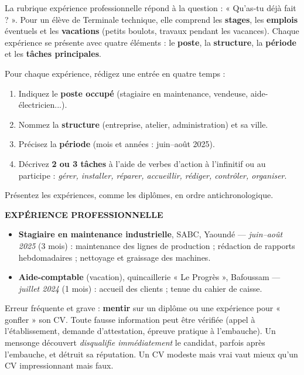 \documentclass[11pt]{article}
\newcommand{\cle}[1]{{\popxbold\color{popdark}#1}}
\newcounter{popsec}
\newcounter{popsub}
\newcommand{\courssub}[1]{%
  \stepcounter{popsub}%
  \par\vspace{9pt}\noindent{\popxbold\fontsize{11.5}{13}\selectfont\color{popink}{\color{poporange}\thepopsec.\thepopsub}\hspace{6pt}#1}\par\nopagebreak\vspace{4pt}
}
\begin{document}
\courssub{L'expérience professionnelle}

La rubrique \cle{expérience professionnelle} répond à la question : « Qu'as-tu déjà fait ? ». Pour un élève de Terminale technique, elle comprend les \textbf{stages}, les \textbf{emplois} éventuels et les \textbf{vacations} (petits boulots, travaux pendant les vacances). Chaque expérience se présente avec quatre éléments : le \textbf{poste}, la \textbf{structure}, la \textbf{période} et les \textbf{tâches principales}.

\begin{methode}
Pour chaque expérience, rédigez une entrée en quatre temps :
\begin{enumerate}
\item Indiquez le \textbf{poste occupé} (stagiaire en maintenance, vendeuse, aide-électricien...).
\item Nommez la \textbf{structure} (entreprise, atelier, administration) et sa ville.
\item Précisez la \textbf{période} (mois et années : juin--août 2025).
\item Décrivez \textbf{2 ou 3 tâches} à l'aide de \cle{verbes d'action} à l'infinitif ou au participe : \emph{gérer, installer, réparer, accueillir, rédiger, contrôler, organiser}.
\end{enumerate}
Présentez les expériences, comme les diplômes, en ordre antichronologique.
\end{methode}

\begin{exemplebox}
\textbf{EXPÉRIENCE PROFESSIONNELLE}
\begin{itemize}
\item \textbf{Stagiaire en maintenance industrielle}, SABC, Yaoundé — \emph{juin--août 2025} (3 mois) : maintenance des lignes de production ; rédaction de rapports hebdomadaires ; nettoyage et graissage des machines.
\item \textbf{Aide-comptable} (vacation), quincaillerie « Le Progrès », Bafoussam — \emph{juillet 2024} (1 mois) : accueil des clients ; tenue du cahier de caisse.
\end{itemize}
\end{exemplebox}

\begin{attention}
Erreur fréquente et grave : \textbf{mentir} sur un diplôme ou une expérience pour « gonfler » son CV. Toute fausse information peut être vérifiée (appel à l'établissement, demande d'attestation, épreuve pratique à l'embauche). Un mensonge découvert \emph{disqualifie immédiatement} le candidat, parfois après l'embauche, et détruit sa réputation. Un CV modeste mais vrai vaut mieux qu'un CV impressionnant mais faux.
\end{attention}
\end{document}
